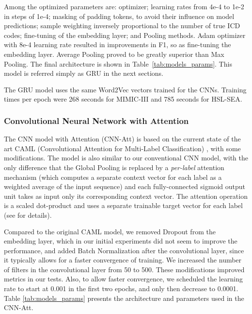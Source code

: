 \documentclass[runningheads]{llncs}
\begin{document}
Among the optimized parameters are: optimizer; learning rates from 4e-4 to 1e-2 in steps of 1e-4; masking of padding tokens, to avoid their influence on model predictions; sample weighting inversely proportional to the number of true ICD codes; fine-tuning of the embedding layer; and Pooling methods. Adam optimizer with 8e-4 learning rate resulted in improvements in F1, so as fine-tuning the embedding layer. Average Pooling proved to be greatly superior than Max Pooling. The final architecture is shown in Table~\ref{tab:models_params}. This model is referred simply as GRU in the next sections.

The GRU model uses the same Word2Vec vectors trained for the CNNs. Training times per epoch were 268 seconds for MIMIC-III and 785 seconds for HSL-SEA.


\subsubsection{Convolutional Neural Network with Attention}

The CNN model with Attention (CNN-Att) is based on the current state of the art CAML (Convolutional Attention for Multi-Label Classification) \cite{mullenbachExplainablePredictionMedical2018}, with some modifications. The model is also similar to our conventional CNN model, with the only difference that the Global Pooling is replaced by a \textit{per-label} attention mechanism (which computes a separate context vector for each label as a weighted average of the input sequence) and each fully-connected sigmoid output unit takes as input only its corresponding context vector. The attention operation is a scaled dot-product \cite{vaswaniAttentionAllYou2017} and uses a separate trainable target vector for each label (see \cite{mullenbachExplainablePredictionMedical2018} for details). 

Compared to the original CAML model, we removed Dropout from the embedding layer, which in our initial experiments did not seem to improve the performance, and added Batch Normalization after the convolutional layer, since it typically allows for a faster convergence of training. We increased the number of filters in the convolutional layer from 50 to 500. These modifications improved metrics in our tests. Also, to allow faster convergence, we scheduled the learning rate to start at 0.001 in the first two epochs, and only then decrease to 0.0001. Table \ref{tab:models_params} presents the architecture and parameters used in the CNN-Att. 
\end{document}

